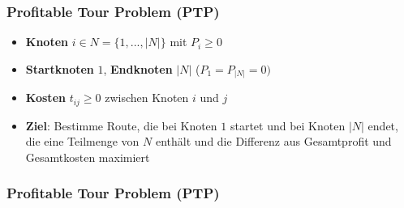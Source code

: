 \documentclass{beamer}
\begin{document}
\begin{frame}
  \frametitle{Profitable Tour Problem (\textsc{PTP})}
  \begin{itemize}
    \item \textbf{Knoten} $i \in N = \{1, ..., |N|\}$ mit $P_i \geq 0$
    \item \textbf{Startknoten} $1$, \textbf{Endknoten} $|N|$ ($P_1 = P_{|N|} = 0)$
    \item \textbf{Kosten} $t_{ij} \geq 0$ zwischen Knoten $i$ und $j$
    \item \textbf{Ziel}: Bestimme Route, die bei Knoten $1$ startet und bei Knoten $|N|$ endet, die eine Teilmenge von $N$
    enthält und die Differenz aus Gesamtprofit und Gesamtkosten maximiert
  \end{itemize}
\end{frame}

\begin{frame}
  \frametitle{Profitable Tour Problem (\textsc{PTP})}
\end{frame}
\end{document}
